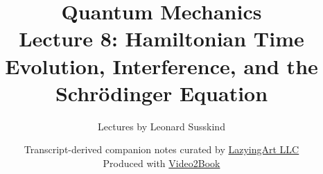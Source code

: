 \documentclass[11pt,oneside]{book}
\begin{document}
\hypersetup{pageanchor=false}
\frontmatter
\title{Quantum Mechanics\\[0.45em]
\large Lecture 8: Hamiltonian Time Evolution, Interference, and the Schr\"odinger Equation}
\author{Lectures by Leonard Susskind}
\date{Transcript-derived companion notes curated by
\href{https://lazying.art}{LazyingArt LLC}\\[0.35em]
\small Produced with
\href{https://github.com/lachlanchen/Video2Book}{Video2Book}}
\maketitle
\hypersetup{pageanchor=true}
\mainmatter

\end{document}

